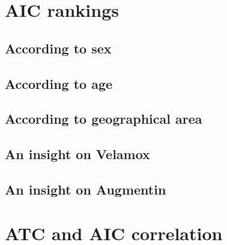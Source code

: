 \section{AIC rankings}

\subsection{According to sex} %

\subsection{According to age}

\subsection{According to geographical area}

\subsection{An insight on Velamox}

\subsection{An insight on Augmentin}

\section{ATC and AIC correlation}

